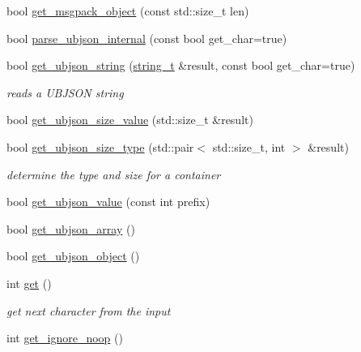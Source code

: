 \begin{DoxyCompactItemize}
\item 
bool \mbox{\hyperlink{classnlohmann_1_1detail_1_1binary__reader_ad1190bb3499e243b0bbf795743a35563}{get\+\_\+msgpack\+\_\+object}} (const std\+::size\+\_\+t len)
\item 
bool \mbox{\hyperlink{classnlohmann_1_1detail_1_1binary__reader_af60c6bba6f1301cb02e0186c99e25751}{parse\+\_\+ubjson\+\_\+internal}} (const bool get\+\_\+char=true)
\item 
bool \mbox{\hyperlink{classnlohmann_1_1detail_1_1binary__reader_a2e01eab458020d18c975e8df55b20eca}{get\+\_\+ubjson\+\_\+string}} (\mbox{\hyperlink{classnlohmann_1_1detail_1_1binary__reader_aa0b9729917ca7ee6ed01e3792341316e}{string\+\_\+t}} \&result, const bool get\+\_\+char=true)
\begin{DoxyCompactList}\small\item\em reads a U\+B\+J\+S\+ON string \end{DoxyCompactList}\item 
bool \mbox{\hyperlink{classnlohmann_1_1detail_1_1binary__reader_a435be58e83c8491556d8f1a1b3439155}{get\+\_\+ubjson\+\_\+size\+\_\+value}} (std\+::size\+\_\+t \&result)
\item 
bool \mbox{\hyperlink{classnlohmann_1_1detail_1_1binary__reader_a4eae4604064b5dfe6d04e42ffc9e0753}{get\+\_\+ubjson\+\_\+size\+\_\+type}} (std\+::pair$<$ std\+::size\+\_\+t, int $>$ \&result)
\begin{DoxyCompactList}\small\item\em determine the type and size for a container \end{DoxyCompactList}\item 
bool \mbox{\hyperlink{classnlohmann_1_1detail_1_1binary__reader_a5f425199a77f403e32f076ff8487f853}{get\+\_\+ubjson\+\_\+value}} (const int prefix)
\item 
bool \mbox{\hyperlink{classnlohmann_1_1detail_1_1binary__reader_a4e8ef9561d4403ea68e3c2712fd289e2}{get\+\_\+ubjson\+\_\+array}} ()
\item 
bool \mbox{\hyperlink{classnlohmann_1_1detail_1_1binary__reader_ad0932dd568fcbbd2b4c2ccf9122544a5}{get\+\_\+ubjson\+\_\+object}} ()
\item 
int \mbox{\hyperlink{classnlohmann_1_1detail_1_1binary__reader_af70e7d5f19a2ee196e24f58acf579411}{get}} ()
\begin{DoxyCompactList}\small\item\em get next character from the input \end{DoxyCompactList}\item 
int \mbox{\hyperlink{classnlohmann_1_1detail_1_1binary__reader_a11a145292c1cc44656c34a6aef38759c}{get\+\_\+ignore\+\_\+noop}} ()

\end{DoxyCompactItemize}
